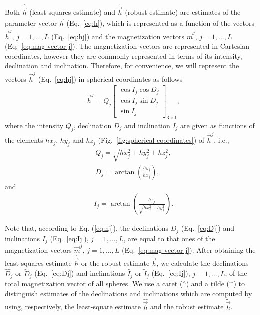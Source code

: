 \documentclass[journal abbreviation, npg]{copernicus}
\providecommand{\DIFadd}[1]{{\protect\color{blue}\uwave{#1}}} %
\providecommand{\DIFaddbegin}{} %
\providecommand{\DIFaddend}{} %
\begin{document}
Both $\hat{\vec{h}}$ (least-squares estimate) and $\tilde{\vec{h}}$ (robust
estimate) are estimates of the \DIFaddbegin \DIFadd{Cartesian coordinates of the }\DIFaddend parameter vector 
$\vec{h}$ (Eq.~\ref{eq:h}),
which is represented \DIFaddbegin \DIFadd{in }\DIFaddend as a function of the vectors $\vec{h}^{j}$, $j = 1,
\ldots, L$ (Eq.~\ref{eq:hj}) and the magnetization vectors $\vec{m}^{j}$, $j
= 1, \ldots, L$ (Eq.~\ref{eq:mag-vector-j}). The magnetization vectors are
represented in Cartesian coordinates, however they are commonly represented
in terms of its intensity, declination and inclination. Therefore, for
convenience, we will represent the vectors $\vec{h}^{j}$ (Eq.~\ref{eq:hj}) in
spherical coordinates as follows
\begin{align}
 &
\vec{h}^{j} = Q_{j}
\begin{bmatrix}
\cos I_{j}  \cos D_{j} \\
\cos I_{j}  \sin D_{j} \\
\sin I_{j}
\end{bmatrix}
_{3 \times 1} ,
\label{eq:hj-spheric}
\end{align}
where the intensity $Q_{j}$, declination $D_{j}$ and inclination
$I_{j}$ are given as functions of the elements $hx_{j}$, $hy_{j}$ and
$hz_{j}$ (Fig.~\ref{fig:spherical-coordinates}) of $\vec{h}^{j}$,
i.e.,
\begin{align}
 &
Q_{j} = \sqrt{hx_{j}^{2} + hy_{j}^{2} + hz_{j}^{2}},
\label{eq:Qj}
\\
&
D_{j} = \arctan \left(\frac{hy_{j}}{hx_{j}} \right),
\label{eq:Dj}
\end{align}
and
\begin{align}
 &
I_{j} = \arctan \left(\frac{hz_{j}}{\sqrt{hx_{j}^{2} + hy_{j}^{2}}} \right).
\label{eq:Ij}
\end{align}

Note that, according to Eq. (\ref{eq:hj}), the declinations $D_{j}$
(Eq.~\ref{eq:Dj}) and inclinations $I_{j}$ (Eq.~\ref{eq:Ij}), $j = 1, \ldots,
L$, are equal to that ones of the magnetization vectors $\vec{m}^{j}$, $j =
1, \ldots, L$ (Eq.~\ref{eq:mag-vector-j}). After obtaining the least-squares
estimate $\hat{\vec{h}}$ or the robust estimate $\tilde{\vec{h}}$, we
calculate the declinations $\hat{D}_{j}$ or $\tilde{D}_{j}$ (Eq.~\ref{eq:Dj})
and inclinations $\hat{I}_{j}$ or $\tilde{I}_{j}$ (Eq.~\ref{eq:Ij}), $j = 1,
\ldots, L$, of the total magnetization vector of all spheres. We use a caret
($^\wedge$) and a tilde ($^\sim$) to distinguish estimates of the
declinations and inclinations which are computed by using, respectively, the
least-square estimate $\hat{\vec{h}}$ and the robust estimate
$\tilde{\vec{h}}$.
\end{document}
